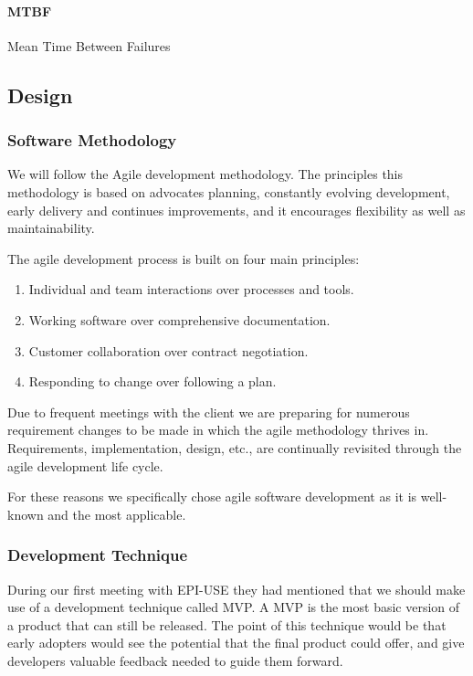 			\paragraph{MTBF} Mean Time Between Failures

\subsection{Design}

	\subsubsection{Software Methodology}
	We will follow the Agile development methodology. The principles this methodology is based on advocates planning, constantly evolving development, early delivery and continues improvements, and it encourages flexibility as well as maintainability.

	\begin{flushleft}
	The agile development process is built on four main principles:
		\begin{enumerate}
			\item Individual and team interactions over processes and tools.
			\item Working software over comprehensive documentation.
			\item Customer collaboration over contract negotiation.
			\item Responding to change over following a plan.
		\end{enumerate}
	\end{flushleft}

\begin{flushleft}
Due to frequent meetings with the client we are preparing for numerous requirement changes to be made in which the agile methodology thrives in. Requirements, implementation, design, etc., are continually revisited through the agile development life cycle.

\bigskip

For these reasons we specifically chose agile software development as it is well-known and the most applicable.
\end{flushleft}

	\subsubsection{Development Technique}
	During our first meeting with EPI-USE they had mentioned that we should make use of a development technique called MVP. A MVP is the most basic version of a product that can still be released. The point of this technique would be that early adopters would see the potential that the final product could offer, and give developers valuable feedback needed to guide them forward.

